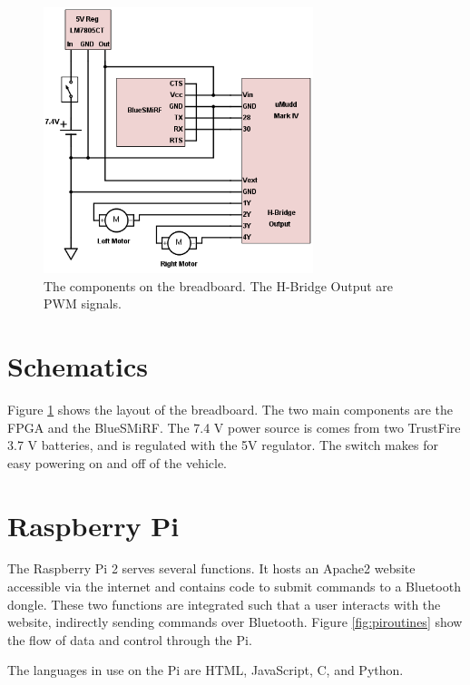 \documentclass[12pt]{article}
\begin{document}
\begin{figure}[h!]
\begin{center}
\includegraphics[width=0.7\textwidth]{breadboard}
\end{center}
\caption{The components on the breadboard. The H-Bridge Output are PWM signals.}
\label{fig:breadboard}
\end{figure}

\section{Schematics}

Figure \ref{fig:breadboard} shows the layout of the breadboard. The two main components are the FPGA and the BlueSMiRF. The 7.4 V power source is comes from two TrustFire 3.7 V batteries, and is regulated with the 5V regulator. The switch makes for easy powering on and off of the vehicle.

\section{Raspberry Pi}

The Raspberry Pi 2 serves several functions. It hosts an Apache2 website accessible via the internet and contains code to submit commands to a Bluetooth dongle. These two functions are integrated such that a user interacts with the website, indirectly sending commands over Bluetooth. Figure \ref{fig:piroutines} show the flow of data and control through the Pi.

The languages in use on the Pi are HTML, JavaScript, C, and Python.
\end{document}
